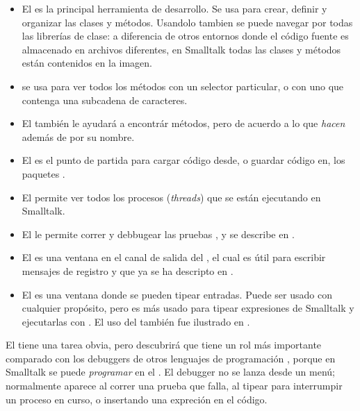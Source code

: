 \documentclass[a4paper,10pt,twoside]{book}
\begin{document}
\begin{itemize}
	\item {El } es la principal herramienta de desarrollo. Se usa para crear, definir y organizar las clases y m\'etodos. Usandolo tambien se puede navegar por todas las librer\'ias de clase: a diferencia de otros entornos donde el c\'odigo fuente es almacenado en archivos diferentes, en Smalltalk todas las clases y m\'etodos est\'an contenidos en la imagen.

	\item{} se usa para ver todos los m\'etodos con un selector particular, o con uno que contenga una subcadena de caracteres.
	
	\item{El } tambi\'en le ayudará a encontr\'ar m\'etodos, pero de acuerdo a lo que \emph{hacen} adem\'as de por su nombre.
	
	\item{El } es el punto de partida para cargar c\'odigo desde, o guardar c\'odigo en, los paquetes .

	\item{El  permite ver todos los procesos (\emph{threads}) que se est\'an ejecutando en Smalltalk.}
	
	\item{El } le permite correr y debbugear las pruebas \SUnit, y se describe en .
	
	\item{El } es una ventana en el canal de salida del , el cual es \'util para escribir mensajes de registro y que ya se ha descripto en .
	
	\item{El } es una ventana donde se pueden tipear entradas.  
	Puede ser usado con cualquier propósito, pero es m\'as usado para tipear expresiones de Smalltalk y 
	ejecutarlas con . El uso del  tambi\'en fue ilustrado en .

\end{itemize}

El  tiene una tarea obvia, pero descubrir\'a que tiene un rol más importante comparado con los debuggers de otros lenguajes de programaci\'on , porque en Smalltalk se puede \emph{programar} en el . El debugger no se lanza desde un men\'u; normalmente aparece al correr una prueba que falla, al tipear  para interrumpir un proceso en curso, o insertando una expreci\'on  en el c\'odigo.
\end{document}
